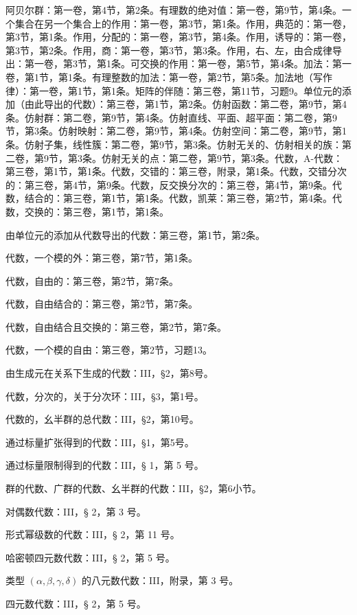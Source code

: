 
阿贝尔群：第一卷，第4节，第2条。有理数的绝对值：第一卷，第9节，第4条。一个集合在另一个集合上的作用：第一卷，第3节，第1条。作用，典范的：第一卷，第3节，第1条。作用，分配的：第一卷，第3节，第4条。作用，诱导的：第一卷，第3节，第2条。作用，商：第一卷，第3节，第3条。作用，右、左，由合成律导出：第一卷，第3节，第1条。可交换的作用：第一卷，第5节，第4条。加法：第一卷，第1节，第1条。有理整数的加法：第一卷，第2节，第5条。加法地（写作律）：第一卷，第1节，第1条。矩阵的伴随：第三卷，第11节，习题9。单位元的添加（由此导出的代数）：第三卷，第1节，第2条。仿射函数：第二卷，第9节，第4条。仿射群：第二卷，第9节，第4条。仿射直线、平面、超平面：第二卷，第9节，第3条。仿射映射：第二卷，第9节，第4条。仿射空间：第二卷，第9节，第1条。仿射子集，线性簇：第二卷，第9节，第3条。仿射无关的、仿射相关的族：第二卷，第9节，第3条。仿射无关的点：第二卷，第9节，第3条。代数，A-代数：第三卷，第1节，第1条。代数，交错的：第三卷，附录，第1条。代数，交错分次的：第三卷，第4节，第9条。代数，反交换分次的：第三卷，第4节，第9条。代数，结合的：第三卷，第1节，第1条。代数，凯莱：第三卷，第2节，第4条。代数，交换的：第三卷，第1节，第1条。

由单位元的添加从代数导出的代数：第三卷，第1节，第2条。

代数，一个模的外：第三卷，第7节，第1条。

代数，自由的：第三卷，第2节，第7条。

代数，自由结合的：第三卷，第2节，第7条。

代数，自由结合且交换的：第三卷，第2节，第7条。

代数，一个模的自由：第三卷，第2节，习题13。

由生成元在关系下生成的代数：III，§2，第8号。

代数，分次的，关于分次环：III，§3，第1号。

代数的，幺半群的总代数：III，§2，第10号。

通过标量扩张得到的代数：III，§1，第5号。

通过标量限制得到的代数：III，§ 1，第 5 号。

群的代数、广群的代数、幺半群的代数：III，§2，第6小节。

对偶数代数：III，§ 2，第 3 号。

形式幂级数的代数：III，§ 2，第 11 号。

哈密顿四元数代数：III，§ 2，第 5 号。

类型 \((\alpha, \beta, \gamma, \delta)\) 的八元数代数：III，附录，第 3 号。

四元数代数：III，§ 2，第 5 号。

